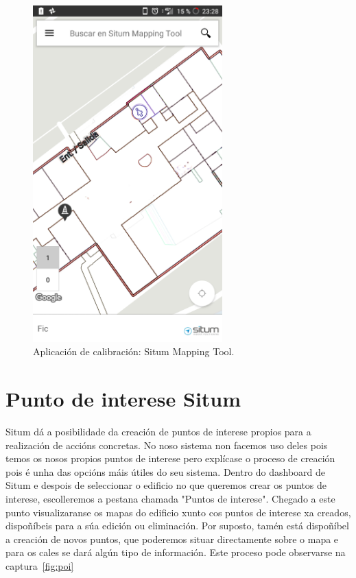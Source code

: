 \begin{figure}[tbh] 
	\begin{center}
		\includegraphics[width=0.65\textwidth]{figures/Capturas/mapping_tool}
		\caption{Aplicación de calibración: Situm Mapping Tool.}
		\label{fig:mapping_tool}
	\end{center}
\end{figure}

\section{Punto de interese Situm}
Situm dá a posibilidade da creación de puntos de interese propios para a realización de accións concretas. No noso sistema non facemos uso deles pois temos os nosos propios puntos de interese pero explícase o proceso de creación pois é unha das opcións máis útiles do seu sistema.
Dentro do dashboard de Situm e despois de seleccionar o edificio no que queremos crear os puntos de interese, escolleremos a pestana chamada "Puntos de interese". Chegado a este punto visualizaranse os mapas do edificio xunto cos puntos de interese xa creados, dispoñíbeis para a súa edición ou eliminación. Por suposto, tamén está dispoñíbel a creación de novos puntos, que poderemos situar directamente sobre o mapa e para os cales se dará algún tipo de información. Este proceso pode observarse na captura~\ref{fig:poi}

